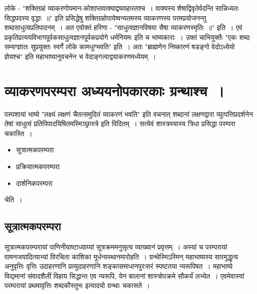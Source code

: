 लोके - "शक्तिग्रहं व्याकरणोपमान-कोशाप्तवाक्याद्व्यवहारतश्च~। वाक्यस्य शेषाद्विवृतेर्वदन्ति सान्निध्यतः सिद्धपदस्य वृद्धाः~॥" इति प्रसिद्धेषु शक्तिग्रहोपायेष्वन्यतमस्य व्याकरणस्य परमप्रयोजनन्तु शब्दसाधुत्वप्रतिपादनम्~। अत एवोक्तं हरिणा - "साधुत्वज्ञानविषया सैषा व्याकरणस्मृतिः~॥" इति~। एवं प्रकृतिप्रत्ययविभागपूर्वकसाधुत्वज्ञानपूर्वकप्रयोगे धर्मनियमः इति च भाष्यकाराः~। उक्तं चाभियुक्तैः "एकः शब्दः सम्यग्ज्ञातः सुप्रयुक्तः स्वर्गे लोके कामधुग्भवति" इति~। अतः "ब्राह्मणेन निष्कारणं षडङ्गो वेदोऽध्येयो ज्ञेयश्च" इति महाभाष्यानुवचनेन च वेदाङ्गत्वाद्व्याकरणमध्येयम्~।
\vspace{-15pt}
\section*{व्याकरणपरम्परा अध्ययनोपकारकाः ग्रन्थाश्च~।}
\vspace{-15pt}
पस्पशायां भाष्ये "लक्ष्यं लक्षणं चैतत्समुदितं व्याकरणं भवति" इति वचनात् शब्दानां लक्षणद्वारा व्युत्पत्तिप्रदर्शनेन तेषां साधुत्वं प्रतिपिपादयिषितमस्मिञ्छ्रास्त्रे इति विदितम्~। सत्येवं शास्त्रस्यास्य त्रिधा प्रसिद्धा परम्परा चकास्ति~।
\vspace{-45pt}
\begin{itemize}
\itemsep=0pt
\item सूत्रात्मकपरम्परा
\item प्रक्रियात्मकपरम्परा
\item दार्शनिकपरम्परा 
\end{itemize}
चेति~।

\subsection*{सूत्रात्मकपरम्परा}
सूत्रात्मकपरम्परायां पाणिनीयाष्टाध्याय्यां सूत्रक्रममनुसृत्य व्याख्यानं प्रवृत्तम्~। अस्यां च परम्परायां वामनजयादित्याभ्यां विरचिता काशिका मूर्धन्यस्थानमारोहति~। ग्रन्थेस्मिऽस्मिन् महाभाष्यस्य सारमुद्धृत्य अनुवृत्तिः वृत्तिः उदाहरणानि प्रत्युदाहरणानि शङ्कासमाधानपुरःसरं स्पष्टतया न्यरूपिषत~। महाभाष्ये विद्यमानां संवादशैलीं विहाय सिद्धान्त एव न्यरूपि, येन बालानां शास्त्रोपक्रमे सौकर्यं लभ्येत~। एवमेवास्यां परम्परायां प्रथमावृत्तिः शब्दकौस्तुभः इत्यादयो ग्रन्थाः चकासते~।


